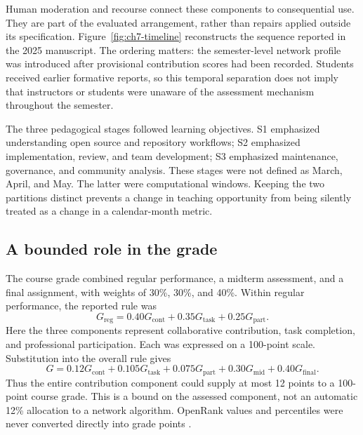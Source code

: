 Human moderation and recourse connect these components to consequential use. They are part of the evaluated arrangement, rather than repairs applied outside its specification. Figure~\ref{fig:ch7-timeline} reconstructs the sequence reported in the 2025 manuscript. The ordering matters: the semester-level network profile was introduced after provisional contribution scores had been recorded. Students received earlier formative reports, so this temporal separation does not imply that instructors or students were unaware of the assessment mechanism throughout the semester.



The three pedagogical stages followed learning objectives. S1 emphasized understanding open source and repository workflows; S2 emphasized implementation, review, and team development; S3 emphasized maintenance, governance, and community analysis. These stages were not defined as March, April, and May. The latter were computational windows. Keeping the two partitions distinct prevents a change in teaching opportunity from being silently treated as a change in a calendar-month metric.

\subsection{A bounded role in the grade}
The course grade combined regular performance, a midterm assessment, and a final assignment, with weights of 30\%, 30\%, and 40\%. Within regular performance, the reported rule was
\begin{equation}
G_{\mathrm{reg}}=0.40G_{\mathrm{cont}}+0.35G_{\mathrm{task}}+0.25G_{\mathrm{part}}.
\label{eq:ch7-regular}
\end{equation}
Here the three components represent collaborative contribution, task completion, and professional participation. Each was expressed on a 100-point scale. Substitution into the overall rule gives
\begin{equation}
G=0.12G_{\mathrm{cont}}+0.105G_{\mathrm{task}}+0.075G_{\mathrm{part}}
  +0.30G_{\mathrm{mid}}+0.40G_{\mathrm{final}}.
\label{eq:ch7-grade}
\end{equation}
Thus the entire contribution component could supply at most 12 points to a 100-point course grade. This is a bound on the assessed component, not an automatic 12\% allocation to a network algorithm. OpenRank values and percentiles were never converted directly into grade points \citep[Section III]{seetmanuscript}.

